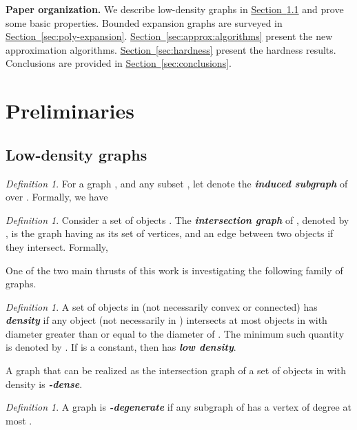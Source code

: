\documentclass[12pt]{article}
\newcommand{\emphic}[2]{\textcolor{blue25}{\textbf{\emph{#1}}}\index{#2}}
\renewcommand{\emphic}[2]{\textbf{\emph{#1}}}
\newcommand{\emphi}[1]{\emphic{#1}{#1}}
\theoremstyle{remark}\theoremheaderfont{\sf}\theorembodyfont{\upshape}
\newtheorem{defn}[theorem]{Definition}
\numberwithin{figure}{section}\numberwithin{table}{section}\numberwithin{equation}{section}
\newcommand{\HLink}[2]{\hyperref[#2]{#1~\ref*{#2}}}
\newcommand{\HLinkPage}[2]{\hyperref[#2]{#1~\ref*{#2}}}
\newcommand{\seclab}[1]{\label{sec:#1}} \newcommand{\secref}[1]{\HLink{Section}{sec:#1}} \newcommand{\secrefpage}[1]{\HLinkPage{Section}{sec:#1}}
\providecommand{\deflab}[1]{\label{def:#1}}
\begin{document}
\bigskip
\noindent \textbf{Paper organization.} We describe low-density graphs in \secref{low:density} and prove some
basic properties.  Bounded expansion graphs are surveyed in
\secref{poly-expansion}.  \secref{approx:algorithms} present the new
approximation algorithms.  \secref{hardness} present the hardness
results. Conclusions are provided in \secref{conclusions}.


\section{Preliminaries} 


\subsection{Low-density graphs} \seclab{low:density}

\begin{defn}
  For a graph , and any subset
  , let  denote the
  \emphi{induced subgraph} of  over . Formally, we have
  
\end{defn}

\begin{defn}
  Consider a set of objects .  The \emphi{intersection graph}
  of , denoted by , is the graph having
   as its set of vertices, and an edge between two objects
   if they intersect.  Formally,
  
\end{defn}




One of the two main thrusts of this work is investigating the
following family of graphs.

\begin{defn}\deflab{low:density}A set of objects  in  (not necessarily convex or
  connected) has \emphi{density } if any object  (not
  necessarily in ) intersects at most  objects in
   with diameter greater than or equal to the diameter of
  . The minimum such quantity is denoted by
  .  If  is a constant, then 
  has \emphi{low density}.

  A graph that can be realized as the intersection graph of a set of
  objects  in  with density  is
  \emphi{-dense}.
\end{defn}


\begin{defn}\deflab{degenerate}A graph  is \emphi{-degenerate} if any subgraph of
   has a vertex of degree at most .
\end{defn}
\end{document}
